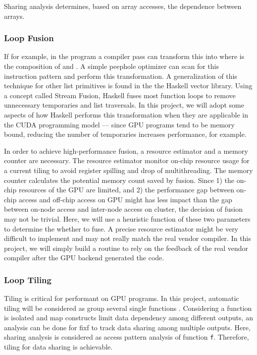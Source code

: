 
Sharing analysis determines, based on array accesses, the
	dependence between arrays.


\subsubsection{Loop Fusion}\label{loop-fusion}

If for example, in the program
 a compiler pass can transform this
into  where  is the composition of
 and . A simple peephole optimizer can scan for this
instruction pattern and perform this transformation. A generalization of
this technique for other list primitives is found in the the Haskell
vector library. Using a concept called Stream Fusion\cite{StreamFusion}, Haskell
fuses most function loops to remove unnecessary temporaries and list
traversals. In this project, we will adopt some aspects of how Haskell
performs this transformation when they are applicable in the CUDA
programming model --- since GPU programs tend to be memory bound,
reducing the number of temporaries increases performance, for example.

In order to achieve high-performance fusion, a resource estimator and a
memory counter are necessary. The resource estimator monitor on-chip
resource usage for a current tiling to avoid register spilling and drop
of multithreading. The memory counter calculates the potential
memory count saved by fusion. Since 1) the on-chip resources of the GPU are
limited, and 2) the performance gap between on-chip access and off-chip
access on GPU might has less impact than the gap between on-node access
and inter-node access on cluster, the decision of fusion may not be
trivial. Here, we will use a heuristic function of these two parameters to
determine the whether to fuse. A precise resource estimator might be
very difficult to implement and may not really match the real vendor
compiler. In this project, we will simply build a routine to rely on the
feedback of the real vendor compiler after the GPU backend generated the
code.

\subsubsection{Loop Tiling}\label{loop-tiling}

Tiling is critical for performant on GPU programs. In this project,
automatic tiling will be considered as group several single functions
. Considering a function  is isolated and map constructs limit
data dependency among different outputs, an analysis can be done for
fix{f} to track data sharing among multiple outputs. Here,
sharing analysis is considered as access pattern analysis of function
\texttt{f}. Therefore, tiling for data sharing is achievable.

